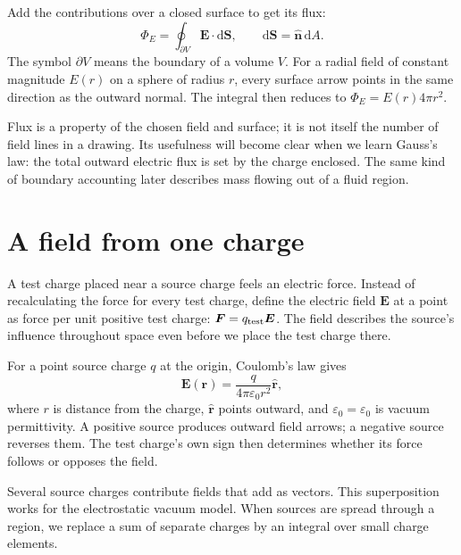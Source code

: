 \documentclass[11pt,oneside]{book}
\newcommand{\dd}{\mathrm{d}}
\newcommand{\vect}[1]{\boldsymbol{#1}}
\newcommand{\eps}{\varepsilon_0}
\theoremstyle{reviewstyle}
\begin{document}
Add the contributions over a closed surface to get its flux:
\begin{equation}
\Phi_E=\oint_{\partial V}\vect E\cdot\dd\vect S,
\qquad \dd\vect S=\hat{\vect n}\,\dd A.
\end{equation}
The symbol $\partial V$ means the boundary of a volume $V$. For a radial field of constant magnitude $E(r)$ on a sphere of radius $r$, every surface arrow points in the same direction as the outward normal. The integral then reduces to $\Phi_E=E(r)4\pi r^2$.

Flux is a property of the chosen field and surface; it is not itself the number of field lines in a drawing. Its usefulness will become clear when we learn Gauss's law: the total outward electric flux is set by the charge enclosed. The same kind of boundary accounting later describes mass flowing out of a fluid region.

\section{A field from one charge}
A test charge placed near a source charge feels an electric force. Instead of recalculating the force for every test charge, define the electric field $\vect E$ at a point as force per unit positive test charge: $\vect F=q_{\rm test}\vect E$. The field describes the source's influence throughout space even before we place the test charge there.

For a point source charge $q$ at the origin, Coulomb's law gives
\begin{equation}
\vect E(\vect r)=\frac{q}{4\pi\eps r^2}\hat{\vect r},
\end{equation}
where $r$ is distance from the charge, $\hat{\vect r}$ points outward, and $\eps=\varepsilon_0$ is vacuum permittivity. A positive source produces outward field arrows; a negative source reverses them. The test charge's own sign then determines whether its force follows or opposes the field.

Several source charges contribute fields that add as vectors. This superposition works for the electrostatic vacuum model. When sources are spread through a region, we replace a sum of separate charges by an integral over small charge elements.
\end{document}
